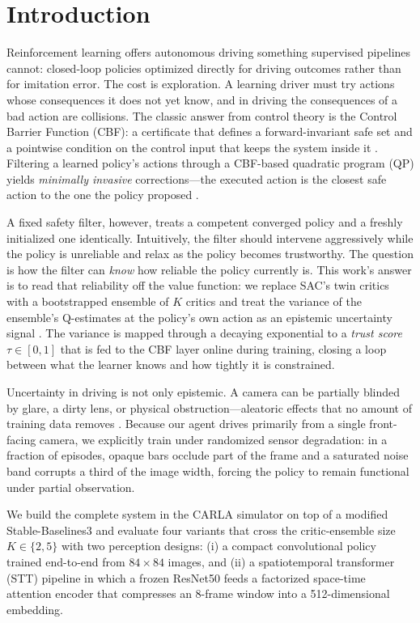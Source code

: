 \documentclass[conference]{IEEEtran}
\begin{document}
\section{Introduction}
Reinforcement learning offers autonomous driving something supervised pipelines cannot: closed-loop policies optimized directly for driving outcomes rather than for imitation error. The cost is exploration. A learning driver must try actions whose consequences it does not yet know, and in driving the consequences of a bad action are collisions. The classic answer from control theory is the Control Barrier Function (CBF): a certificate that defines a forward-invariant safe set and a pointwise condition on the control input that keeps the system inside it \cite{ames2017cbf, ames2019cbf}. Filtering a learned policy's actions through a CBF-based quadratic program (QP) yields \emph{minimally invasive} corrections---the executed action is the closest safe action to the one the policy proposed \cite{cheng2019endtoend}.

A fixed safety filter, however, treats a competent converged policy and a freshly initialized one identically. Intuitively, the filter should intervene aggressively while the policy is unreliable and relax as the policy becomes trustworthy. The question is how the filter can \emph{know} how reliable the policy currently is. This work's answer is to read that reliability off the value function: we replace SAC's twin critics \cite{haarnoja2018sac, fujimoto2018td3} with a bootstrapped ensemble of $K$ critics and treat the variance of the ensemble's Q-estimates at the policy's own action as an epistemic uncertainty signal \cite{lakshminarayanan2017ensembles}. The variance is mapped through a decaying exponential to a \emph{trust score} $\tau \in [0,1]$ that is fed to the CBF layer online during training, closing a loop between what the learner knows and how tightly it is constrained.

Uncertainty in driving is not only epistemic. A camera can be partially blinded by glare, a dirty lens, or physical obstruction---aleatoric effects that no amount of training data removes \cite{kendall2017uncertainties}. Because our agent drives primarily from a single front-facing camera, we explicitly train under randomized sensor degradation: in a fraction of episodes, opaque bars occlude part of the frame and a saturated noise band corrupts a third of the image width, forcing the policy to remain functional under partial observation.

We build the complete system in the CARLA simulator \cite{dosovitskiy2017carla} on top of a modified Stable-Baselines3 \cite{raffin2021sb3} and evaluate four variants that cross the critic-ensemble size $K \in \{2,5\}$ with two perception designs: (i) a compact convolutional policy trained end-to-end from $84{\times}84$ images, and (ii) a spatiotemporal transformer (STT) pipeline in which a frozen ResNet50 \cite{he2016resnet} feeds a factorized space-time attention encoder \cite{vaswani2017attention} that compresses an 8-frame window into a 512-dimensional embedding.
\end{document}
